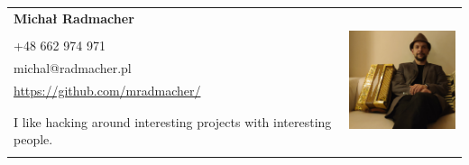 \documentclass[a4paper]{article}
\begin{document}
\begin{tabular}{p{7cm}r}
\textbf{Michał Radmacher}&\multirow{10}{*}{\includegraphics[width=40mm]{mr.jpg}}\\
&\\
+48 662 974 971&\\
michal@radmacher.pl&\\
\href{https://github.com/mradmacher/}{https://github.com/mradmacher/}\\
&\\
&\\
I like hacking around interesting projects with interesting people.
&\\
&
\end{tabular}

\subsection*{}
\end{document}
